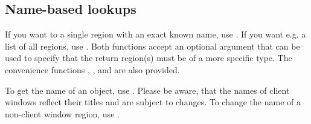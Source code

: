 \subsection{Name-based lookups}

If you want to a single region with an exact known name, use
. If you want e.g. a list of all regions,
use . Both functions accept an
optional argument that can be used to specify that the return region(s)
must be of a more specific type. The convenience functions
, ,
 and  are also
provided.

To get the name of an object, use . Please be
aware, that the names of client windows reflect their titles and
are subject to changes. To change the name of a non-client window
region, use .




